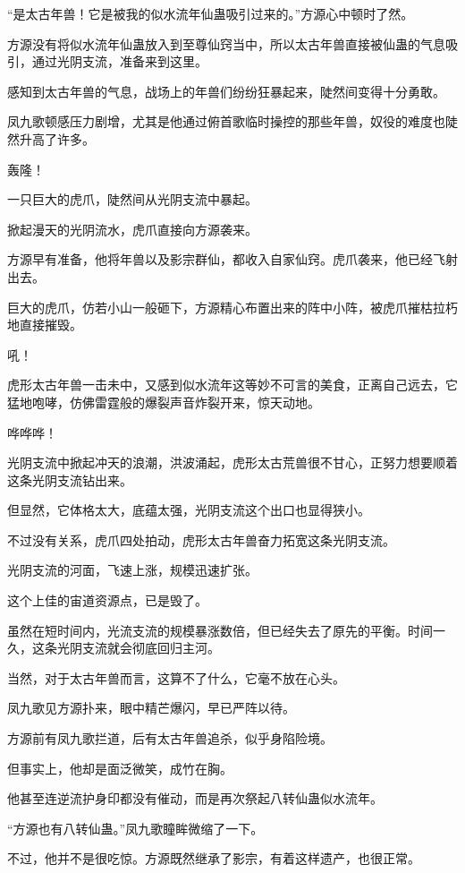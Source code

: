 \begin{this_body}
“是太古年兽！它是被我的似水流年仙蛊吸引过来的。”方源心中顿时了然。

方源没有将似水流年仙蛊放入到至尊仙窍当中，所以太古年兽直接被仙蛊的气息吸引，通过光阴支流，准备来到这里。

感知到太古年兽的气息，战场上的年兽们纷纷狂暴起来，陡然间变得十分勇敢。

凤九歌顿感压力剧增，尤其是他通过俯首歌临时操控的那些年兽，奴役的难度也陡然升高了许多。

轰隆！

一只巨大的虎爪，陡然间从光阴支流中暴起。

掀起漫天的光阴流水，虎爪直接向方源袭来。

方源早有准备，他将年兽以及影宗群仙，都收入自家仙窍。虎爪袭来，他已经飞射出去。

巨大的虎爪，仿若小山一般砸下，方源精心布置出来的阵中小阵，被虎爪摧枯拉朽地直接摧毁。

吼！

虎形太古年兽一击未中，又感到似水流年这等妙不可言的美食，正离自己远去，它猛地咆哮，仿佛雷霆般的爆裂声音炸裂开来，惊天动地。

哗哗哗！

光阴支流中掀起冲天的浪潮，洪波涌起，虎形太古荒兽很不甘心，正努力想要顺着这条光阴支流钻出来。

但显然，它体格太大，底蕴太强，光阴支流这个出口也显得狭小。

不过没有关系，虎爪四处拍动，虎形太古年兽奋力拓宽这条光阴支流。

光阴支流的河面，飞速上涨，规模迅速扩张。

这个上佳的宙道资源点，已是毁了。

虽然在短时间内，光流支流的规模暴涨数倍，但已经失去了原先的平衡。时间一久，这条光阴支流就会彻底回归主河。

当然，对于太古年兽而言，这算不了什么，它毫不放在心头。

凤九歌见方源扑来，眼中精芒爆闪，早已严阵以待。

方源前有凤九歌拦道，后有太古年兽追杀，似乎身陷险境。

但事实上，他却是面泛微笑，成竹在胸。

他甚至连逆流护身印都没有催动，而是再次祭起八转仙蛊似水流年。

“方源也有八转仙蛊。”凤九歌瞳眸微缩了一下。

不过，他并不是很吃惊。方源既然继承了影宗，有着这样遗产，也很正常。


\end{this_body}

